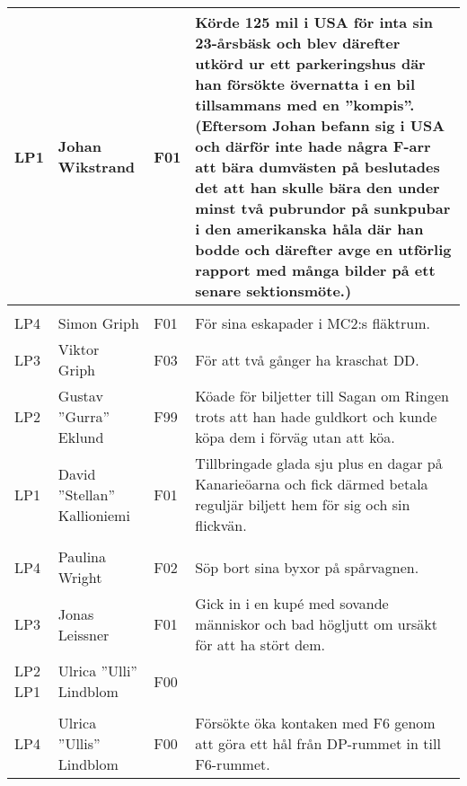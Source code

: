 \documentclass[a4paper]{article}
\begin{document}
\begin{longtable}{p{5mm}>{\raggedright\arraybackslash}p{30mm}p{10mm}p{108mm}}
LP1 & Johan Wikstrand & F01 & Körde 125 mil i USA för inta sin 23-årsbäsk och blev därefter utkörd ur ett parkeringshus där han försökte övernatta i en bil tillsammans med en ''kompis''. (Eftersom Johan befann sig i USA och därför inte hade några F-arr att bära dumvästen på beslutades det att han skulle bära den under minst två pubrundor på sunkpubar i den amerikanska håla där han bodde och därefter avge en utförlig rapport med många bilder på ett senare sektionsmöte.) \\ \hline %

\rowcolor{veryLightGray} \multicolumn{4}{l}{\textbf{2003/2004}} \\ \hline

LP4 & Simon Griph & F01 & För sina eskapader i MC2:s fläktrum. \\ \hline

LP3 & Viktor Griph & F03 & För att två gånger ha kraschat DD. \\ \hline 

LP2 & Gustav ''Gurra'' Eklund & F99 & Köade för biljetter till Sagan om Ringen trots att han hade guldkort och kunde köpa dem i förväg utan att köa. \\ \hline

LP1 & David ''Stellan'' Kallioniemi & F01 & Tillbringade glada sju plus en dagar på Kanarieöarna och fick därmed betala reguljär biljett hem för sig och sin flickvän. \\ \hline

\rowcolor{veryLightGray} \multicolumn{4}{l}{\textbf{2002/2003}} \\ \hline

LP4 & Paulina Wright & F02 & Söp bort sina byxor på spårvagnen. \\ \hline

LP3 & Jonas Leissner & F01 & Gick in i en kupé med sovande människor och bad högljutt om ursäkt för att ha stört dem. \\ \hline

\makecell{LP2 \\ LP1} & Ulrica ''Ulli'' Lindblom & F00 & \\ \hline

\rowcolor{veryLightGray} \multicolumn{4}{l}{\textbf{2001/2002}} \\ \hline

LP4 & Ulrica ''Ullis'' Lindblom & F00 & Försökte öka kontaken med F6 genom att göra ett hål från DP-rummet in till F6-rummet. \\ \hline %


\end{longtable}
\end{document}
